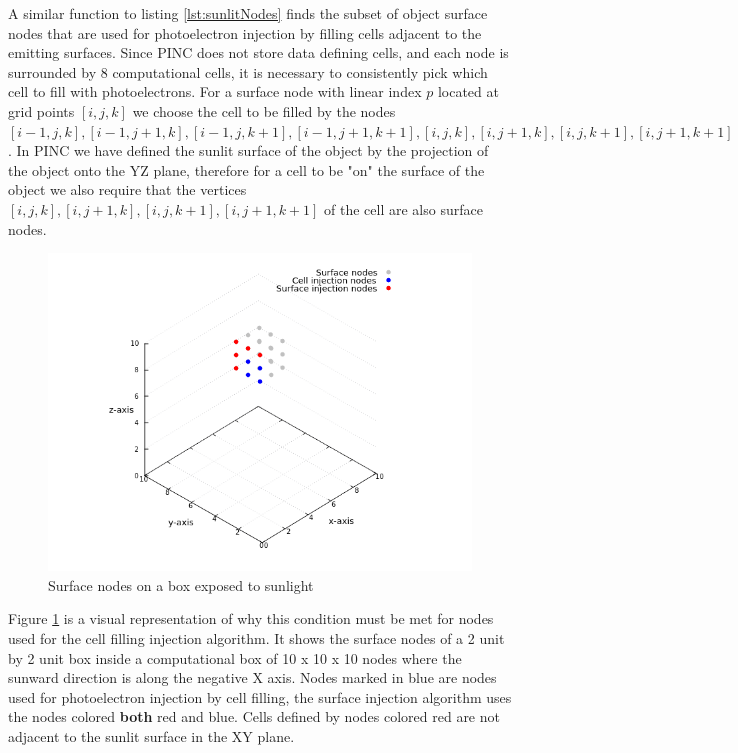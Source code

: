 A similar function to listing \ref{lst:sunlitNodes} finds the subset of object surface nodes that are used for photoelectron injection by filling cells adjacent to the emitting surfaces. Since PINC does not store data defining cells, and each node is surrounded by 8 computational cells, it is necessary to consistently pick which cell to fill with photoelectrons. For a surface node with linear index $p$ located at grid points $[i,j,k]$ we choose the cell to be filled by the nodes $[i-1,j,k], [i-1,j+1,k], [i-1,j,k+1], [i-1,j+1,k+1], [i,j,k], [i,j+1,k], [i,j,k+1], [i,j+1,k+1]$. In PINC we have defined the sunlit surface of the object by the projection of the object onto the YZ plane, therefore for a cell to be "on" the surface of the object we also require that the vertices $[i,j,k], [i,j+1,k], [i,j,k+1], [i,j+1,k+1]$ of the cell are also surface nodes.

\begin{figure}[h!]
    \centering
    \includegraphics[scale=0.6]{figures/ReferenceFigures/nodes.png}
    \caption{Surface nodes on a box exposed to sunlight}
    \label{fig:sunlitNodes}
\end{figure}

Figure \ref{fig:sunlitNodes} is a visual representation of why this condition must be met for nodes used for the cell filling injection algorithm. It shows the surface nodes of a 2 unit by 2 unit box inside a computational box of 10 x 10 x 10 nodes where the sunward direction is along the negative X axis. Nodes marked in blue are nodes used for photoelectron injection by cell filling, the surface injection algorithm uses the nodes colored \textbf{both} red and blue. Cells defined by nodes colored red are not adjacent to the sunlit surface in the XY plane.

